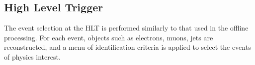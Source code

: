     






\subsection{High Level Trigger}

The event selection at the HLT is performed similarly to that used in the offline processing. For each event, objects such as electrons, muons, jets are reconstructed, and a menu of identification criteria is applied to select the events of physics interest.

